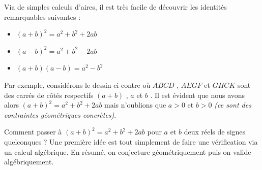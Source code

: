 \begin{figure} 
	\vspace{-.75em}
	\begin{center}
	\end{center}
	\vspace{-3em}
\end{figure} 

Via de simples calculs d'aires, il est très facile de découvrir les identités remarquables suivantes :

\begin{itemize}[label=\small\textbullet]
	\item $(a + b)^2 = a^2 + b^2 + 2ab$

	\item $(a - b)^2 = a^2 + b^2 - 2ab$

	\item $(a + b)(a - b) = a^2 - b^2$
\end{itemize}


\medskip

Par exemple, considérons le dessin ci-contre où $ABCD$ , $AEGF$ et $GHCK$ sont des carrés de côtés respectifs $(a + b)$ , $a$ et $b$ .
Il est évident que nous avons alors $(a + b)^2 = a^2 + b^2 + 2 ab$ mais n'oublions que $a > 0$ et $b > 0$ \emph{(ce sont des contraintes géométriques concrètes)}.


\medskip

Comment passer à $(a + b)^2 = a^2 + b^2 + 2 ab$ pour $a$ et $b$ deux réels de signes quelconques ?
Une première idée est tout simplement de faire une vérification via un calcul algébrique. En résumé, on conjecture géométriquement puis on valide algébriquement.




